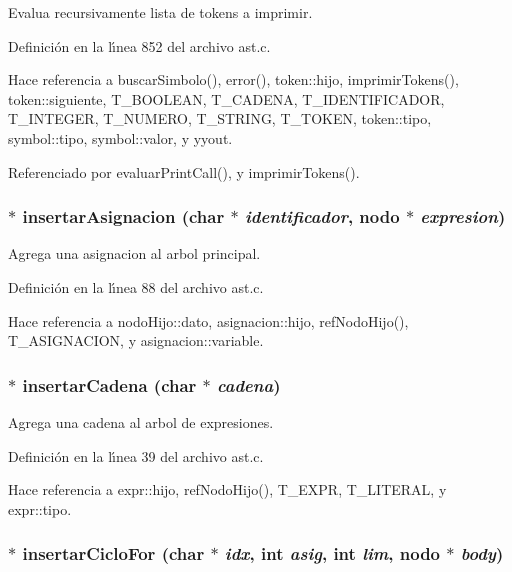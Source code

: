 Evalua recursivamente lista de tokens a imprimir. 



Definici\'{o}n en la l\'{\i}nea 852 del archivo ast.c.

Hace referencia a buscar\-Simbolo(), error(), token::hijo, imprimir\-Tokens(), token::siguiente, T\_\-BOOLEAN, T\_\-CADENA, T\_\-IDENTIFICADOR, T\_\-INTEGER, T\_\-NUMERO, T\_\-STRING, T\_\-TOKEN, token::tipo, symbol::tipo, symbol::valor, y yyout.

Referenciado por evaluar\-Print\-Call(), y imprimir\-Tokens().
\subsubsection{$\ast$ insertar\-Asignacion (char $\ast$ {\em identificador}, {\bf nodo} $\ast$ {\em expresion})}\label{ast_8c_a7}


Agrega una asignacion al arbol principal. 



Definici\'{o}n en la l\'{\i}nea 88 del archivo ast.c.

Hace referencia a nodo\-Hijo::dato, asignacion::hijo, ref\-Nodo\-Hijo(), T\_\-ASIGNACION, y asignacion::variable.
\subsubsection{$\ast$ insertar\-Cadena (char $\ast$ {\em cadena})}\label{ast_8c_a4}


Agrega una cadena al arbol de expresiones. 



Definici\'{o}n en la l\'{\i}nea 39 del archivo ast.c.

Hace referencia a expr::hijo, ref\-Nodo\-Hijo(), T\_\-EXPR, T\_\-LITERAL, y expr::tipo.
\subsubsection{$\ast$ insertar\-Ciclo\-For (char $\ast$ {\em idx}, int {\em asig}, int {\em lim}, {\bf nodo} $\ast$ {\em body})}\label{ast_8c_a13}


